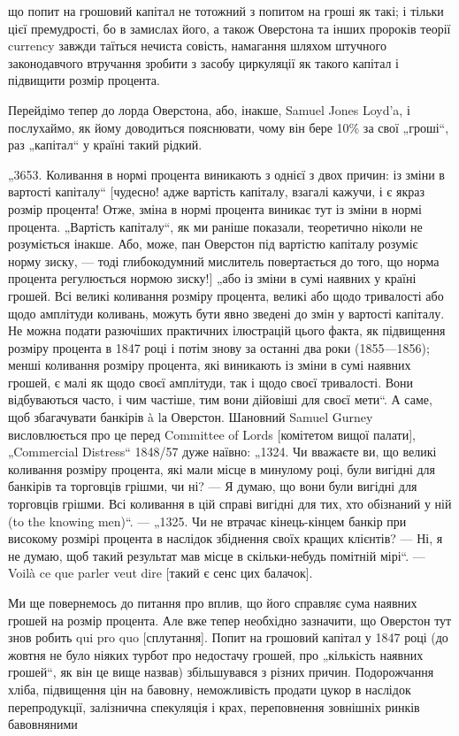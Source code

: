 \parcont{}  %
що попит на грошовий капітал не тотожний з попитом на гроші
як такі; і тільки цієї премудрості, бо в замислах його, а також
Оверстона та інших пророків теорії currency завжди таїться нечиста совість, намагання шляхом
штучного законодавчого втручання зробити з засобу циркуляції як такого капітал і підвищити
розмір процента.

Перейдімо тепер до лорда Оверстона, або, інакше, Samuel
Jones Loyd’a, і послухаймо, як йому доводиться пояснювати, чому
він бере 10\% за свої „гроші“, раз „капітал“ у країні такий
рідкий.

„3653. Коливання в нормі процента виникають з однієї з двох
причин: із зміни в вартості капіталу“ [чудесно! адже вартість
капіталу, взагалі кажучи, і є якраз розмір процента! Отже, зміна
в нормі процента виникає тут із зміни в нормі процента. „Вартість капіталу“, як ми раніше показали,
теоретично ніколи не
розуміється інакше. Або, може, пан Оверстон під вартістю
капіталу розуміє норму зиску, — тоді глибокодумний мислитель
повертається до того, що норма процента регулюється нормою
зиску!] „або із зміни в сумі наявних у країні грошей. Всі великі
коливання розміру процента, великі або щодо тривалості або
щодо амплітуди коливань, можуть бути явно зведені до змін
у вартості капіталу. Не можна подати разючіших практичних ілюстрацій цього факта, як підвищення
розміру процента в 1847 році
і потім знову за останні два роки (1855—1856); менші коливання
розміру процента, які виникають із зміни в сумі наявних грошей,
є малі як щодо своєї амплітуди, так і щодо своєї тривалості. Вони
відбуваються часто, і чим частіше, тим вони дійовіші для своєї
мети“. А саме, щоб збагачувати банкірів à lа Оверстон. Шановний Samuel Gurney висловлюється про це
перед Committee of
Lords [комітетом вищої палати], „Commercial Distress“ 1848/57 дуже
наївно: „1324. Чи вважаєте ви, що великі коливання розміру
процента, які мали місце в минулому році, були вигідні для
банкірів та торговців грішми, чи ні? — Я думаю, що вони були
вигідні для торговців грішми. Всі коливання в цій справі вигідні
для тих, хто обізнаний у ній (to the knowing men)“. — „1325. Чи не
втрачає кінець-кінцем банкір при високому розмірі процента
в наслідок збіднення своїх кращих клієнтів? — Ні, я не думаю,
щоб такий результат мав місце в скільки-небудь помітній мірі“. — Voilà ce que parler veut dire
[такий є сенс цих балачок].

Ми ще повернемось до питання про вплив, що його справляє
сума наявних грошей на розмір процента. Але вже тепер необхідно зазначити, що Оверстон тут знов
робить qui pro quo [сплутання]. Попит на грошовий капітал у 1847 році (до жовтня не
було ніяких турбот про недостачу грошей, про „кількість
наявних грошей“, як він це вище назвав) збільшувався з різних
причин. Подорожчання хліба, підвищення цін на бавовну, неможливість продати цукор в наслідок
перепродукції, залізнична
спекуляція і крах, переповнення зовнішніх ринків бавовняними
\parbreak{}  %
